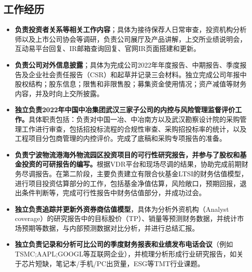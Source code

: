 \documentclass{resume}
\begin{document}
\vspace{-18pt}
\begin{1.5}
\section{工作经历}
\begin{itemize}[itemsep=0.5ex, parsep=0.3ex]
  \item \textbf{负责投资者关系等相关工作内容}；具体为接待保荐人日常审查，投资机构分析师以及上市公司协会等调研，负责公司展厅及产品讲解，上交所业绩说明会，互动易平台回复、IR邮箱查询回复、官网IR页面搭建和更新。
  \item \textbf{负责公司对外信息披露}；具体为完成公司2022年年度报告、中期报告、季度报告及企业社会责任报告（CSR）和起草并记录三会材料。独立完成公司年报中股权结构；股东信息；限售和非限售股；募集资金使用情况；资产减值等财务内容，并及时向上交所披露。
\end{itemize}

\begin{itemize}[itemsep=0.5ex, parsep=0.3ex]
  \item \textbf{独立负责2022年中国中冶集团武汉三家子公司的内控与风险管理监督评价工作。}具体职责包括：负责对中国一冶、中冶南方以及武汉勘察设计院的采购管理工作进行审查，包括招投标流程的合规性审查、采购招投标率的统计，以及工程项目分包商管理的内控评价。完成了底稿和采购专项报告的准备。
  \item \textbf{负责宁波物流港海外物流园区投资项目的可行性研究报告，并参与了股权和基金投资的可研报告的编写。}根据VDR平台和现场尽调的结果，协助完成前期财务尽调报告。在第二阶段，主要负责建立有限合伙基金LTSI的财务估值模型，进行项目投资估算部分的工作，包括基金净值估算，风险敞口，预期回报，退出条件判断等，完成可行性报告中财务估值部分，并成功过会。
\end{itemize}

\begin{itemize}[itemsep=0.5ex, parsep=0.3ex]
  \item \textbf{独立负责追踪并更新外资券商估值模型}，具体为分析外资机构（Analyst coverage）的研究报告中的目标股价（TP）、销量等预测财务数据，并统计市场预期等数据，与内部预测数据对比分析，并进行总结汇报。
  \item \textbf{独立负责记录和分析可比公司的季度财务报表和业绩发布电话会议}（例如TSMC;AAPL;GOOGL等互联网企业），并梳理分析形成行业研究报告，如关于芯片短缺，笔记本/手机/PC出货量，ESG等TMT行业课题。
\end{itemize}
\end{1.5}
\end{document}
